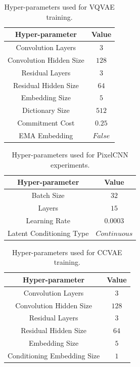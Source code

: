\begin{table}[h!]
    \centering
    \begin{tabular}{c|c}
    \hline
    \textbf{Hyper-parameter} & \textbf{Value} \\
    \hline
    Convolution Layers & $3$\\
    Convolution Hidden Size & $128$\\
    Residual Layers & $3$\\
    Residual Hidden Size & $64$\\
    Embedding Size & $5$\\
    Dictionary Size & $512$\\
    Commitment Cost & $0.25$\\
    EMA Embedding & $False$\\
    \hline
    \end{tabular}
\caption{Hyper-parameters used for VQVAE training.}
\label{table:vqvae-hyperparams}
\end{table}

\begin{table}[h!]
    \centering
    \begin{tabular}{c|c}
    \hline
    \textbf{Hyper-parameter} & \textbf{Value} \\
    \hline
    Batch Size & $32$\\
    Layers & $15$\\
    Learning Rate & $0.0003$\\
    Latent Conditioning Type & $Continuous$\\
    \hline
    \end{tabular}
\caption{Hyper-parameters used for PixelCNN experiments.}
\label{table:pixelcnn-hyperparams}
\end{table}

\begin{table}[h!]
    \centering
    \begin{tabular}{c|c}
    \hline
    \textbf{Hyper-parameter} & \textbf{Value} \\
    \hline
    Convolution Layers & $3$\\
    Convolution Hidden Size & $128$\\
    Residual Layers & $3$\\
    Residual Hidden Size & $64$\\
    Embedding Size & $5$\\
    Conditioning Embedding Size & $1$\\
    \hline
    \end{tabular}
\caption{Hyper-parameters used for CCVAE training.}
\label{table:ccvae-hyperparams}
\end{table}

